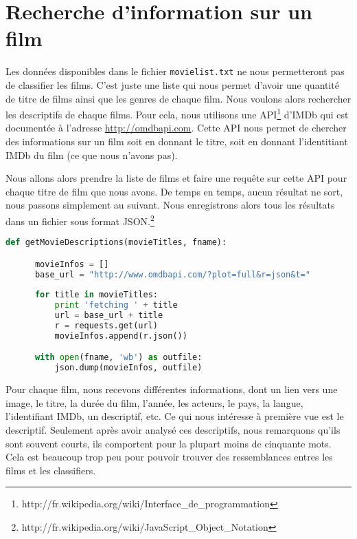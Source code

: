 \section{Recherche d'information sur un film}

Les données disponibles dans le fichier \texttt{movielist.txt} ne nous permetteront pas de classifier les films. C'est juste une liste qui nous permet d'avoir une quantité de titre de films ainsi que les genres de chaque film. Nous voulons alors rechercher les descriptifs de chaque films. Pour cela, nous utilisons une API\footnote{http://fr.wikipedia.org/wiki/Interface\_de\_programmation} d'IMDb qui est documentée à l'adresse \url{http://omdbapi.com}. Cette API nous permet de chercher des informations sur un film soit en donnant le titre, soit en donnant l'identitiant IMDb du film (ce que nous n'avons pas). 

Nous allons alors prendre la liste de films et faire une requête sur cette API pour chaque titre de film que nous avons. De temps en temps, aucun résultat ne sort, nous passons simplement au suivant. Nous enregistrons alors tous les résultats dans un fichier sous format JSON.\footnote{http://fr.wikipedia.org/wiki/JavaScript\_Object\_Notation} \\

\begin{lstlisting}[language=python]
  def getMovieDescriptions(movieTitles, fname):

      movieInfos = []
      base_url = "http://www.omdbapi.com/?plot=full&r=json&t="
    
      for title in movieTitles:
          print 'fetching ' + title
          url = base_url + title
          r = requests.get(url)
          movieInfos.append(r.json())

      with open(fname, 'wb') as outfile:
          json.dump(movieInfos, outfile)
\end{lstlisting}

Pour chaque film, nous recevons différentes informations, dont un lien vers une image, le titre, la durée du film, l'année, les acteurs, le pays, la langue, l'identifiant IMDb, un descriptif, etc. Ce qui nous intéresse à première vue est le descriptif. Seulement après avoir analysé ces descriptifs, nous remarquons qu'ils sont souvent courts, ils comportent pour la plupart moins de cinquante mots. Cela est beaucoup trop peu pour pouvoir trouver des ressemblances entres les films et les classifiers. 

